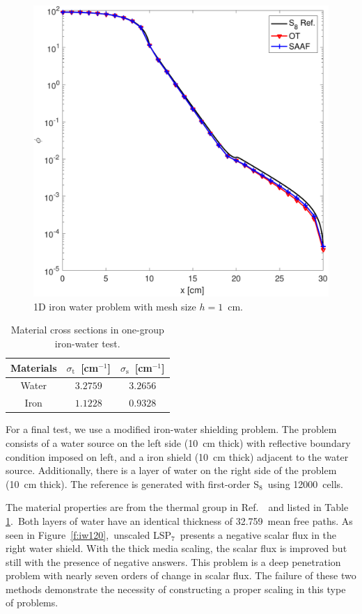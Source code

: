 \documentclass[review]{elsarticle}
\newcommand{\st}{\sigma_\mathrm{t}}
\newcommand{\sigs}{\sigma_\mathrm{s}}
\newcommand{\pp}[1]{P$_{#1}$}
\begin{document}
\begin{figure}[ht!]
	
	\centering
	\includegraphics[width=.75\linewidth]{PHY_IW-60.pdf}
	\caption{1D iron water problem with mesh size $h=1$\ cm.}
	\label{f:iw60}
	
\end{figure}

\begin{table}[ht!]
	\centering
	\caption{{Material cross sections in one-group iron-water test.}}
	\label{t:iw}
	\hspace*{-1cm}\begin{tabular}{|c|c|c|}
		\hline
		Materials & $\st$\ [cm$^{-1}$] & $\sigs$\ [cm$^{-1}$]\\
		\hline
		Water& $3.2759$ & $3.2656$ \\
		\hline
		Iron&$1.1228$&$0.9328$\\
		\hline
	\end{tabular}
\end{table}

For a final test, we use a modified iron-water shielding problem. The problem consists of a water source on the left side (10\ cm thick) with reflective boundary condition imposed on left, and a iron shield  (10\ cm thick) adjacent to the water source. Additionally, there is a layer of water on the right side of the problem  (10\ cm thick). The reference is generated with first-order S$_8$\ using 12000\ cells.

The material properties are from the thermal group in Ref.\ \cite{adams_iron_water}\ {and listed in Table \ref{t:iw}}.\ Both layers of water have an identical thickness of 32.759\ mean free paths. As seen in Figure\ \ref{f:iw120},\ unscaled LS\pp{7}\ presents a negative scalar flux in the right water shield. With the thick media scaling, the scalar flux is improved but still with the presence of negative answers. This problem is a deep penetration problem with nearly seven orders of change in scalar flux. The failure of these two methods demonstrate the necessity of constructing a proper scaling in this type of problems.
\end{document}
